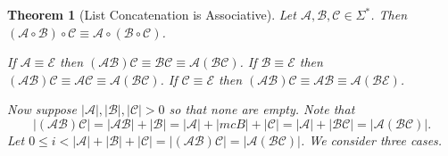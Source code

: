 \documentclass[12pt]{article}
\theoremstyle{break}
\theoremstyle{break}
\newtheorem{theorem}{Theorem}[section]
\theoremstyle{break}
\theoremstyle{break}
\theoremstyle{break}
\newtheorem{informal definition}[definition]{Informal Definition}
\newcommand{\mc}[1]{\mathcal{#1}}
\begin{document}
\begin{theorem}[List Concatenation is Associative]
\label{thm:concatassoc}
Let $\mc{A}, \mc{B}, \mc{C}\in\Sigma^*$.
Then $(\mc{A}\circ\mc{B})\circ \mc{C} \equiv \mc{A}\circ(\mc{B}\circ\mc{C})$.

If $\mc{A}\equiv \mc{E}$ then $(\mc{A}\mc{B})\mc{C} \equiv \mc{B}\mc{C} \equiv \mc{A}(\mc{B}\mc{C})$.
If $\mc{B} \equiv \mc{E}$ then $(\mc{A}\mc{B})\mc{C}\equiv \mc{A}\mc{C} \equiv \mc{A}(\mc{B}\mc{C})$.
If $\mc{C} \equiv \mc{E}$ then $(\mc{A}\mc{B})\mc{C}\equiv \mc{A}\mc{B}\equiv \mc{A}(\mc{B}\mc{E})$.

Now suppose $|\mc{A}|, |\mc{B}|, |\mc{C}| > 0$ so that none are empty.
Note that
$$
|(\mc{A}\mc{B})\mc{C}| = |\mc{A}\mc{B}| + |\mc{B}| = |\mc{A}|+|mc{B}|+|\mc{C}| = |\mc{A}| + |\mc{B}\mc{C}| = |\mc{A}(\mc{B}\mc{C})|.
$$
Let $0\le i < |\mc{A}|+|\mc{B}|+|\mc{C}| = |(\mc{A}\mc{B})\mc{C}| = |\mc{A}(\mc{B}\mc{C})|$.
We consider three cases.


\end{theorem}
\end{document}
